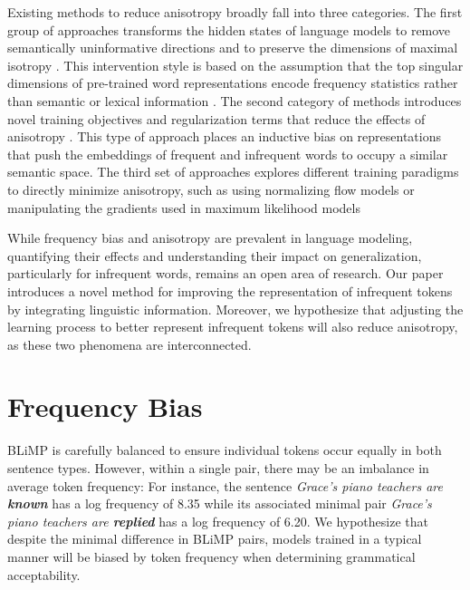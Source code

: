 Existing methods to reduce anisotropy broadly fall into three categories. The first group of approaches transforms the hidden states of language models to remove semantically uninformative directions and to preserve the dimensions of maximal isotropy \citep{arora2016simple, mu2018all, raunak2019effective, su2021whitening,bis2021too}. This intervention style is based on the assumption that the top singular dimensions of pre-trained word representations encode frequency statistics rather than semantic or lexical information \citep{mu2018all}. The second category of methods introduces novel training objectives and regularization terms that reduce the effects of anisotropy \citep{gong2018frage, gao2018representation, wang2019improving}. This type of approach places an inductive bias on representations that push the embeddings of frequent and infrequent words to occupy a similar semantic space. The third set of approaches explores different training paradigms to directly minimize anisotropy, such as using normalizing flow models \citep{li2020sentence} or manipulating the gradients used in maximum likelihood models \citep{yu2022rare}

\vspace{1em}

While frequency bias and anisotropy are prevalent in language modeling, quantifying their effects and understanding their impact on generalization, particularly for infrequent words, remains an open area of research. Our paper introduces a novel method for improving the representation of infrequent tokens by integrating linguistic information. Moreover, we hypothesize that adjusting the learning process to better represent infrequent tokens will also reduce anisotropy, as these two phenomena are interconnected.

\section{Frequency Bias}
\label{section:freq-bias}



BLiMP is carefully balanced to ensure individual tokens occur equally in both sentence types. However, within a single pair, there may be an imbalance in average token frequency: For instance, the sentence
\textit{Grace's piano teachers are \textbf{known}} has a log frequency of 8.35 while its associated minimal pair \textit{Grace's piano teachers are \textbf{replied}} has a log frequency of 6.20.  We hypothesize that despite the minimal difference in BLiMP pairs, models trained in a typical manner will be biased by token frequency when determining grammatical acceptability.

